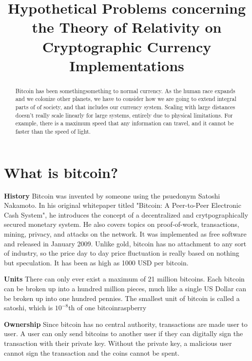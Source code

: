 \documentclass[conference]{IEEEtran}
\begin{document}
\title{Hypothetical Problems concerning the Theory of Relativity on Cryptographic Currency Implementations}
\author
{
}
\maketitle

\begin{abstract}
Bitcoin has been somethingsomething to normal currency. As the human race expands and we colonize other planets, we have to consider how we are going to extend integral parts of of society, and that includes our currency system. Scaling with large distances doesn't really scale linearly for large systems, entirely due to physical limitations. For example, there is a maximum speed that any information can travel, and it cannot be faster than the speed of light.
\end{abstract}

\section{What is bitcoin?}
\textbf{History} Bitcoin was invented by someone using the psuedonym Satoshi Nakamoto. In his original whitepaper titled "Bitcoin: A Peer-to-Peer Electronic Cash System", he introduces the concept of a decentralized and crytpographically secured monetary system. He also covers topics on proof-of-work, transactions, mining, privacy, and attacks on the network.\cite{nakamoto} It was implemented as free software and released in January 2009. Unlike gold, bitcoin has no attachment to any sort of industry, so the price day to day price fluctuation is really based on nothing but speculation. It has been as high as 1000 USD per bitcoin.\cite{1000usd}

\textbf{Units} There can only ever exist a maximum of 21 million bitcoins. Each bitcoin can be broken up into a hundred million pieces, much like a single US Dollar can be broken up into one hundred pennies. The smallest unit of bitcoin is called a satoshi, which is $10^{-8}$th of one bitcoinraspberry

\textbf{Ownership} Since bitcoin has no central authority, transactions are made user to user. A user can only send bitcoins to another user if they can digitally sign the transaction with their private key. Without the private key, a malicious user cannot sign the transaction and the coins cannot be spent. 
\end{document}
